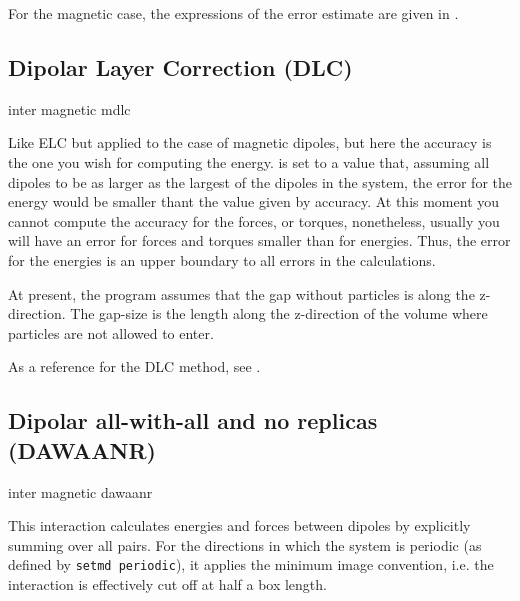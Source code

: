 For the magnetic case, the expressions of the error estimate are given
in \cite{cerda08a}.

\subsection{Dipolar Layer Correction (DLC)}

\begin{essyntax}
  inter magnetic mdlc  
  \begin{features}
  \end{features}
\end{essyntax}

Like ELC but applied to the case of magnetic dipoles, but here the
accuracy is the one you wish for computing the energy.
 is set to a value that, assuming all dipoles to be as
larger as the largest of the dipoles in the system, the error for the
energy would be smaller thant the value given by accuracy. At this
moment you cannot compute the accuracy for the forces, or torques,
nonetheless, usually you will have an error for forces and torques
smaller than for energies. Thus, the error for the energies is an
upper boundary to all errors in the calculations.

At present, the program assumes that the gap without particles is
along the z-direction.  The gap-size is the length along the
z-direction of the volume where particles are not allowed to enter.

As a reference for the DLC method, see \cite{brodka04a}.

\subsection{Dipolar all-with-all and no replicas (DAWAANR)}

\begin{essyntax}
  inter magnetic  dawaanr
  \begin{features}
  \end{features}
\end{essyntax}

This interaction calculates energies and forces between dipoles by
explicitly summing over all pairs.  For the directions in which the
system is periodic (as defined by \texttt{setmd periodic}), it applies
the minimum image convention, i.e. the interaction is effectively cut
off at half a box length.

